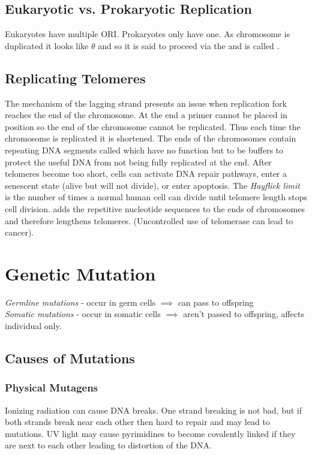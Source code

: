 \documentclass[../Bio_chemistryReview.tex]{subfiles}
\begin{document}
\subsection{Eukaryotic vs. Prokaryotic Replication}

Eukaryotes have multiple ORI. Prokaryotes only have one. As chromosome is
duplicated it looks like $ \theta $ and so it is said to proceed via the
 and is called .

\subsection{Replicating Telomeres}

The mechanism of the lagging strand presents an issue when replication fork
reaches the end of the chromosome. At the end a primer cannot be placed in
position so the end of the chromosome cannot be replicated. Thus each time the
chromosome is replicated it is shortened. The ends of the chromosomes contain
repeating DNA segments called  which have no function but to
be buffers to protect the useful DNA from not being fully replicated at the end.
After telomeres become too short, cells can activate DNA repair pathways, enter a
senescent state (alive but will not divide), or enter apoptosis. The
\emph{Hayflick limit} is the number of times a normal human cell can divide
until telomere length stops cell division.  adds the
repetitive nucleotide sequences to the ends of chromosomes and therefore
lengthens telomeres. (Uncontrolled use of telomerase can lead to cancer).

\section{Genetic Mutation}
\emph{Germline mutations} - occur in germ cells $ \implies $ can pass to
offspring\\
\emph{Somatic mutations} - occur in somatic cells $ \implies $ aren't passed to
offspring, affects individual only.

\subsection{Causes of Mutations}

\subsubsection{Physical Mutagens}
Ionizing radiation can cause DNA breaks. One strand breaking is not bad, but if
both strands break near each other then hard to repair and may lead to
mutations. UV light may cause pyrimidines to become covalently linked if they
are next to each other leading to distortion of the DNA.
\end{document}
